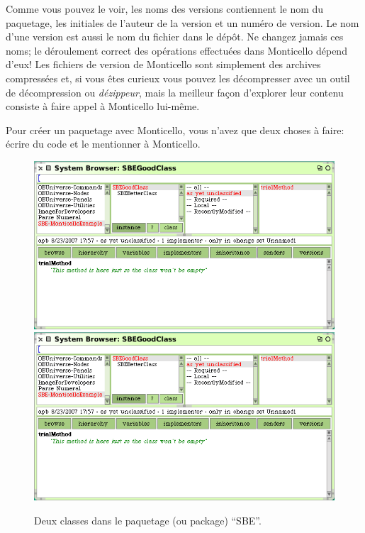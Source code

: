\documentclass[a4paper,10pt,twoside]{book}
\begin{document}
Comme vous pouvez le voir, les noms des versions contiennent le nom du paquetage, les initiales de l'auteur de la version et un num\'ero de version.
Le nom d'une version est aussi le nom du fichier dans le d\'ep\^ot. Ne
changez jamais ces noms; le d\'eroulement correct des op\'erations
effectu\'ees dans Monticello d\'epend d'eux!
Les fichiers de version de Monticello sont simplement des archives compress\'ees
 et, si vous \^etes curieux vous pouvez les d\'ecompresser avec un outil 
de d\'ecompression ou \emph{d\'ezippeur}, mais la meilleur fa\c{c}on 
d'explorer leur contenu consiste \`a faire appel \`a Monticello lui-m\^eme.

Pour cr\'eer un paquetage avec Monticello, vous n'avez que deux choses \`a faire:
\'ecrire du code et le mentionner \`a Monticello.


\begin{figure}[btp]
	\begin{center}
	\ifluluelse
		{\includegraphics[width=\textwidth]{MCnewcategory}}
		{\includegraphics[scale=0.7]{MCnewcategory}}
	\end{center}
	\caption{Deux classes dans le paquetage (ou package) ``SBE''.}
	\label{fig:MCnewcategory}
\end{figure}
\end{document}
